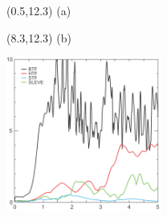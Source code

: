 \documentclass{article}
\begin{document}
\TPMargin{2pt}
\begin{textblock}{0.5}(0.5,12.3)
\normalsize
(a)
\end{textblock}
\begin{textblock}{1}(8.3,12.3)
\normalsize
(b)
\end{textblock}
\begin{minipage}{1.8in}
	\vspace*{-0.13in}
	\includegraphics[height=2in]{img/klemp-w.png}
\end{minipage}
\hspace{1em}
\begin{minipage}{2.5in}
	\footnotesize
	
\end{minipage}
\end{document}
